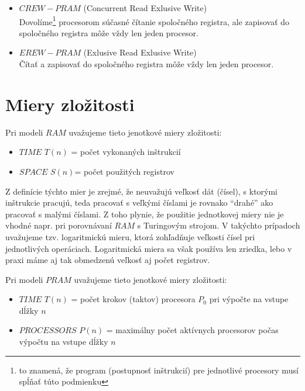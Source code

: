 \begin{enumerate}
\begin{itemize}
\begin{itemize}
{      nedeterministický prístup v modeli $PRAM$ t.j. môže sa stať,
      že pri opakovanom výpočte na rovnakom vstupe dostaneme
      rozdielne výstupy} z procesorov žiadajúcich o zápis zapíše
      svoju hodnotu do registra
    \end{itemize}
    \item $CREW-PRAM$ (Concurrent Read Exlusive Write) \\ Dovolíme\footnote{to
    znamená, že program (postupnosť inštrukcií) pre jednotlivé
    procesory musí spĺňať túto podmienku}
    procesorom súčasné čítanie spoločného registra, ale zapisovať do
    spoločného registra môže vždy len jeden procesor.
    \item $EREW-PRAM$ (Exlusive Read Exlusive Write) \\ Čítať a zapisovať do
    spoločného registra môže vždy len jeden procesor.
  \end{itemize}
\end{enumerate}

\section{Miery zložitosti}

Pri modeli $RAM$ uvažujeme tieto jenotkové miery zložitosti:
\begin{itemize}
  \item $TIME$ $T(n)$ = počet vykonaných inštrukcií
  \item $SPACE$ $S(n)$= počet použitých registrov
\end{itemize}
Z definície týchto mier je zrejmé, že neuvažujú veľkosť dát
(čísel), s ktorými inštrukcie pracujú, teda pracovať s veľkými
číslami je rovnako ``drahé'' ako pracovať s malými číslami. Z toho
plynie, že použitie jednotkovej miery nie je vhodné napr. pri
porovnávaní $RAM$ s Turingovým strojom. V takýchto prípadoch
uvažujeme tzv. logaritmickú mieru, ktorá zohľadňuje veľkosti čísel
pri jednotlivých operáciach. Logaritmická miera sa však používa
len zriedka, lebo v praxi máme aj tak obmedzenú veľkosť aj počet
registrov.

\pagebreak

Pri modeli $PRAM$ uvažujeme tieto jenotkové miery zložitosti:
\begin{itemize}
  \item $TIME$ $T(n)$ = počet krokov (taktov) procesora $P_0$ pri
  výpočte na vstupe dĺžky $n$
  \item $PROCESSORS$ $P(n)$ = maximálny počet aktívnych procesorov
  počas výpočtu na vstupe dĺžky $n$
\end{itemize}

